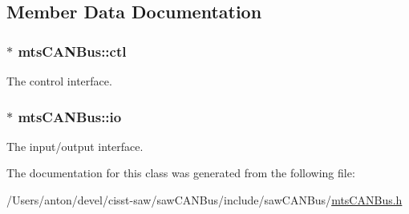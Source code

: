 \subsection{Member Data Documentation}
\hypertarget{classmts_c_a_n_bus_ae87e117a52479bae3ec4464f2448e8c2}{}
\subsubsection[{ctl}]{$\ast$ mts\+C\+A\+N\+Bus\+::ctl\hspace{0.3cm}{\ttfamily [protected]}}\label{classmts_c_a_n_bus_ae87e117a52479bae3ec4464f2448e8c2}


The control interface. 

\hypertarget{classmts_c_a_n_bus_a273a160e43d6b59b9f451c7ef8c1f93e}{}
\subsubsection[{io}]{$\ast$ mts\+C\+A\+N\+Bus\+::io\hspace{0.3cm}{\ttfamily [protected]}}\label{classmts_c_a_n_bus_a273a160e43d6b59b9f451c7ef8c1f93e}


The input/output interface. 



The documentation for this class was generated from the following file\+:\begin{DoxyCompactItemize}
\item 
/\+Users/anton/devel/cisst-\/saw/saw\+C\+A\+N\+Bus/include/saw\+C\+A\+N\+Bus/\hyperlink{mts_c_a_n_bus_8h}{mts\+C\+A\+N\+Bus.\+h}\end{DoxyCompactItemize}
